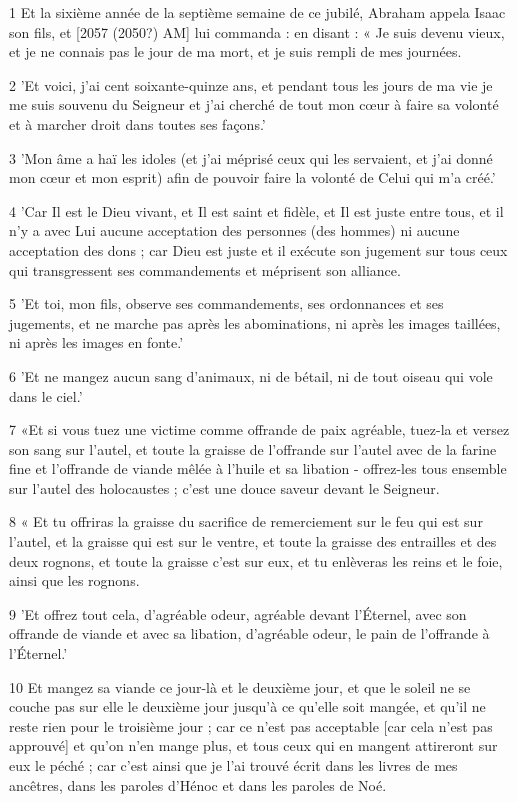 \par 1 Et la sixième année de la septième semaine de ce jubilé, Abraham appela Isaac son fils, et [2057 (2050?) AM] lui commanda : en disant : « Je suis devenu vieux, et je ne connais pas le jour de ma mort, et je suis rempli de mes journées.
\par 2 'Et voici, j'ai cent soixante-quinze ans, et pendant tous les jours de ma vie je me suis souvenu du Seigneur et j'ai cherché de tout mon cœur à faire sa volonté et à marcher droit dans toutes ses façons.'
\par 3 'Mon âme a haï les idoles (et j'ai méprisé ceux qui les servaient, et j'ai donné mon cœur et mon esprit) afin de pouvoir faire la volonté de Celui qui m'a créé.'
\par 4 'Car Il est le Dieu vivant, et Il est saint et fidèle, et Il est juste entre tous, et il n'y a avec Lui aucune acceptation des personnes (des hommes) ni aucune acceptation des dons ; car Dieu est juste et il exécute son jugement sur tous ceux qui transgressent ses commandements et méprisent son alliance.
\par 5 'Et toi, mon fils, observe ses commandements, ses ordonnances et ses jugements, et ne marche pas après les abominations, ni après les images taillées, ni après les images en fonte.'
\par 6 'Et ne mangez aucun sang d'animaux, ni de bétail, ni de tout oiseau qui vole dans le ciel.'
\par 7 «Et si vous tuez une victime comme offrande de paix agréable, tuez-la et versez son sang sur l'autel, et toute la graisse de l'offrande sur l'autel avec de la farine fine et l'offrande de viande mêlée à l'huile et sa libation - offrez-les tous ensemble sur l'autel des holocaustes ; c'est une douce saveur devant le Seigneur.
\par 8 « Et tu offriras la graisse du sacrifice de remerciement sur le feu qui est sur l'autel, et la graisse qui est sur le ventre, et toute la graisse des entrailles et des deux rognons, et toute la graisse c'est sur eux, et tu enlèveras les reins et le foie, ainsi que les rognons.
\par 9 'Et offrez tout cela, d'agréable odeur, agréable devant l'Éternel, avec son offrande de viande et avec sa libation, d'agréable odeur, le pain de l'offrande à l'Éternel.'
\par 10 Et mangez sa viande ce jour-là et le deuxième jour, et que le soleil ne se couche pas sur elle le deuxième jour jusqu'à ce qu'elle soit mangée, et qu'il ne reste rien pour le troisième jour ; car ce n'est pas acceptable [car cela n'est pas approuvé] et qu'on n'en mange plus, et tous ceux qui en mangent attireront sur eux le péché ; car c'est ainsi que je l'ai trouvé écrit dans les livres de mes ancêtres, dans les paroles d'Hénoc et dans les paroles de Noé.
